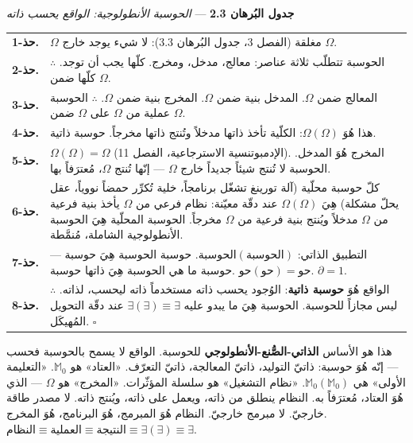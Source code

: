 \documentclass[10pt, openany, oneside]{book}
\renewcommand{\footnotesize}{\fontsize{8.5}{11}\selectfont}
\begin{document}
\vspace{0.5em}

\textbf{جدول البُرهان 2.3} --- \textit{الحوسبة الأنطولوجية: الواقع يحسب ذاته}

\vspace{0.5em}

{\footnotesize
\noindent\begin{tabular}{r p{}}
\textbf{حذ-1.} & $\Omega$ مغلقة (الفصل 3، جدول البُرهان 3.3): لا شيء يوجد خارج $\Omega$. \\[0.3em]
\textbf{حذ-2.} & الحوسبة تتطلّب ثلاثة عناصر: معالج، مدخل، ومخرج. كلّها يجب أن توجد. $\therefore$ كلّها ضمن $\Omega$. \\[0.3em]
\textbf{حذ-3.} & المعالج ضمن $\Omega$. المدخل بنية ضمن $\Omega$. المخرج بنية ضمن $\Omega$. $\therefore$ الحوسبة عملية من $\Omega$ على $\Omega$ ضمن $\Omega$. \\[0.3em]
\textbf{حذ-4.} & هذا هُوَ $\Omega(\Omega)$: الكلّية تأخذ ذاتها مدخلاً وتُنتج ذاتها مخرجاً. حوسبة ذاتية. \\[0.3em]
\textbf{حذ-5.} & $\Omega(\Omega) = \Omega$ (الإدمبوتنسية الاسترجاعية، الفصل 11). المخرج هُوَ المدخل. الحوسبة لا تُنتج شيئاً جديداً خارج $\Omega$ --- إنّها تُنتج $\Omega$، مُعترَفاً بها. \\[0.3em]
\textbf{حذ-6.} & كلّ حوسبة محلّية (آلة تورينغ تشغّل برنامجاً، خلية تُكرِّر حمضاً نووياً، عقل يحلّ مشكلة) هِيَ $\Omega(\Omega)$ عند دقّة معيّنة: نظام فرعي من $\Omega$ يأخذ بنية فرعية من $\Omega$ مدخلاً ويُنتج بنية فرعية من $\Omega$ مخرجاً. الحوسبة المحلّية هِيَ الحوسبة الأنطولوجية الشاملة، مُنمَّطة. \\[0.3em]
\textbf{حذ-7.} & التطبيق الذاتي: $\text{الحوسبة}(\text{الحوسبة})$. حوسبة الحوسبة هِيَ حوسبة --- حوسبة ما هي الحوسبة هِيَ ذاتها حوسبة. $\text{حو}(\text{حو}) = \text{حو}$. $\partial = 1$. \\[0.3em]
\textbf{حذ-8.} & $\therefore$ الواقع هُوَ \textbf{حوسبة ذاتية}: الوُجود يحسب ذاته مستخدماً ذاته ليحسب، لذاته. ليس مجازاً للحوسبة. الحوسبة هِيَ ما يبدو عليه $\exists(\exists) \equiv \exists$ عند دقّة التحويل المُهيكَل. $\square$ \\[0.3em]
\end{tabular}
}

\vspace{0.8em}

\noindent هذا هو الأساس \textbf{الذاتي-الصُّنع-الأنطولوجي} للحوسبة. الواقع لا يسمح بالحوسبة فحسب --- إنّه هُوَ حوسبة: ذاتيّ التوليد، ذاتيّ المعالجة، ذاتيّ التعرّف. «العتاد» هو $\mathbb{M}_0$. «التعليمة الأولى» هي $\mathbb{M}_0(\mathbb{M}_0)$. «نظام التشغيل» هو سلسلة المؤثّرات. «المخرج» هو $\Omega$ --- الذي هُوَ العتاد، مُعترَفاً به. النظام ينطلق من ذاته، ويعمل على ذاته، ويُنتج ذاته. لا مصدر طاقة خارجيّ. لا مبرمج خارجيّ. النظام هُوَ المبرمج، هُوَ البرنامج، هُوَ المخرج. $\text{النظام} \equiv \text{العملية} \equiv \text{النتيجة} \equiv \exists(\exists) \equiv \exists$.
\end{document}
